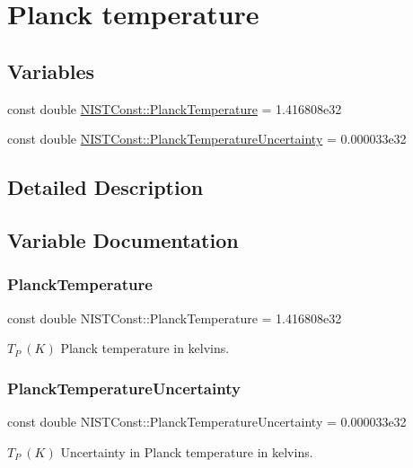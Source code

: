 \hypertarget{group___planck_temperature}{}\section{Planck temperature}
\label{group___planck_temperature}
\subsection*{Variables}
\begin{DoxyCompactItemize}
\item 
const double \hyperlink{group___planck_temperature_ga19bf9bbc3c9fee330296d21ed42fbb51}{N\+I\+S\+T\+Const\+::\+Planck\+Temperature} = 1.\+416808e32
\item 
const double \hyperlink{group___planck_temperature_gaf4a05bd7cc77c51eb7f8258fab36d521}{N\+I\+S\+T\+Const\+::\+Planck\+Temperature\+Uncertainty} = 0.\+000033e32
\end{DoxyCompactItemize}


\subsection{Detailed Description}


\subsection{Variable Documentation}
\mbox{\label{group___planck_temperature_ga19bf9bbc3c9fee330296d21ed42fbb51}} 
\subsubsection{\texorpdfstring{Planck\+Temperature}{PlanckTemperature}}
{\footnotesize\ttfamily const double N\+I\+S\+T\+Const\+::\+Planck\+Temperature = 1.\+416808e32}

$T_P \ (K)$ Planck temperature in kelvins. \mbox{\label{group___planck_temperature_gaf4a05bd7cc77c51eb7f8258fab36d521}} 
\subsubsection{\texorpdfstring{Planck\+Temperature\+Uncertainty}{PlanckTemperatureUncertainty}}
{\footnotesize\ttfamily const double N\+I\+S\+T\+Const\+::\+Planck\+Temperature\+Uncertainty = 0.\+000033e32}

$T_P \ (K)$ Uncertainty in Planck temperature in kelvins. 